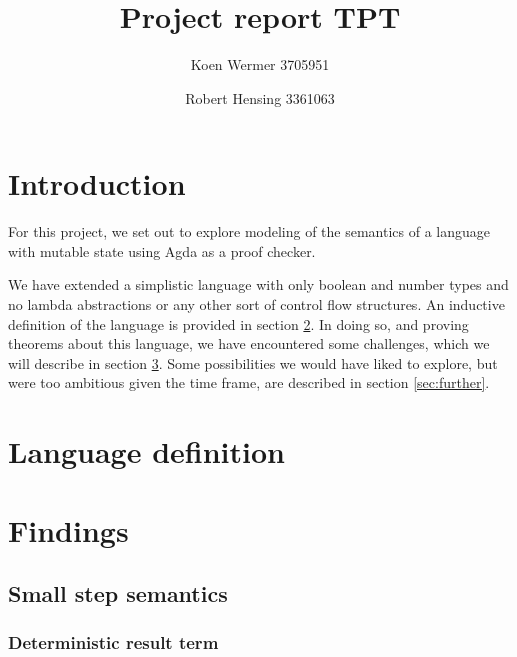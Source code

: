 \documentclass{article}
\author{Koen Wermer 3705951 \and Robert Hensing 3361063}
\title{Project report TPT}
\newcommand{\sectionref}[1]{section \ref{sec:#1}}
\begin{document}
\maketitle

\tableofcontents


%

\section{Introduction}

For this project, we set out to explore modeling of the semantics of a
language with mutable state using Agda as a proof checker.

We have extended a simplistic language with only boolean and number
types and no lambda abstractions or any other sort of control flow
structures.
An inductive definition of the language is provided in
\sectionref{def}.
In doing so, and proving theorems about this language, we have
encountered some challenges, which we will describe in
\sectionref{findings}.
Some possibilities we would have liked to explore, but were too
ambitious given the time frame, are described in \sectionref{further}.

\section{Language definition}\label{sec:def}


\section{Findings}\label{sec:findings}

\subsection{Small step semantics}

\subsubsection{Deterministic result term}
\end{document}

